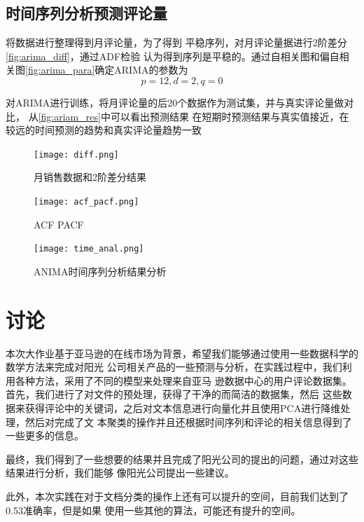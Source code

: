 \section{时间序列分析预测评论量}

将数据进行整理得到月评论量，为了得到
平稳序列，对月评论量据进行2阶差分\autoref{fig:arima_diff}，通过ADF检验
认为得到序列是平稳的。通过自相关图和偏自相关图\autoref{fig:arima_para}确定ARIMA的参数为
\begin{equation}
    p=12,d=2,q=0
\end{equation}

对ARIMA进行训练，将月评论量的后20个数据作为测试集，并与真实评论量做对比， 从\autoref{fig:ariam_res}中可以看出预测结果
在短期时预测结果与真实值接近，在较远的时间预测的趋势和真实评论量趋势一致

\begin{figure}
    \centering
    \texttt{[image: diff.png]}
    \caption{月销售数据和2阶差分结果}
    \label{fig:arima_diff}
\end{figure}

\begin{figure}
    \centering
    \texttt{[image: acf\_pacf.png]}
    \caption{ACF PACF}
    \label{fig:arima_para}
\end{figure}

\begin{figure}
    \centering
    \texttt{[image: time\_anal.png]}
    \caption{ANIMA时间序列分析结果分析}
    \label{fig:arima_res}
\end{figure}
\chapter{讨论}
本次大作业基于亚马逊的在线市场为背景，希望我们能够通过使用一些数据科学的数学方法来完成对阳光
公司相关产品的一些预测与分析，在实践过程中，我们利用各种方法，采用了不同的模型来处理来自亚马
逊数据中心的用户评论数据集。首先，我们进行了对文件的预处理，获得了干净的而简洁的数据集，然后
这些数据来获得评论中的关键词，之后对文本信息进行向量化并且使用PCA进行降维处理，然后对完成了文
本聚类的操作并且还根据时间序列和评论的相关信息得到了一些更多的信息。

最终，我们得到了一些想要的结果并且完成了阳光公司的提出的问题，通过对这些结果进行分析，我们能够
像阳光公司提出一些建议。

此外，本次实践在对于文档分类的操作上还有可以提升的空间，目前我们达到了0.53准确率，但是如果
使用一些其他的算法，可能还有提升的空间。
